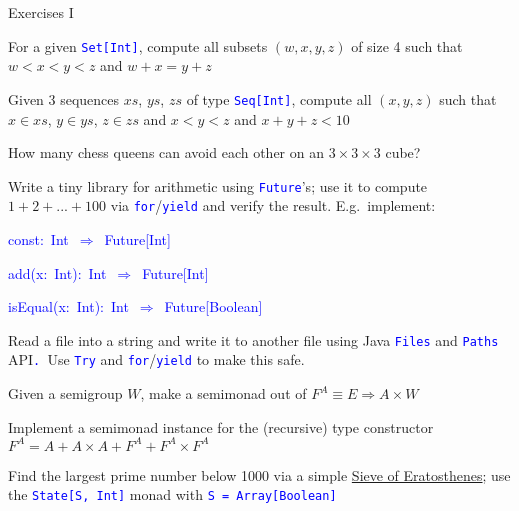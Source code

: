 \documentclass[english]{beamer}
\newenvironment{lyxcode}
   {\par\begin{list}{}{
     \setlength{\rightmargin}{\leftmargin}
     \setlength{\listparindent}{0pt}%
     \raggedright
     \setlength{\itemsep}{0pt}
     \setlength{\parsep}{0pt}
     \normalfont\ttfamily}%
    \def\{{\char`\{}
    \def\}{\char`\}}
    \def\textasciitilde{\char`\~}
    \item[]}
   {\end{list}}
\begin{document}
\begin{frame}{Exercises I}
\begin{enumerate}
\item For a given \texttt{\textcolor{blue}{\footnotesize{}Set{[}Int{]}}},
compute all subsets $\left(w,x,y,z\right)$ of size 4 such that $w<x<y<z$
and $w+x=y+z$
\item Given 3 sequences $xs$, $ys$, $zs$ of type \texttt{\textcolor{blue}{\footnotesize{}Seq{[}Int{]}}},
compute all $\left(x,y,z\right)$ such that $x\in xs$, $y\in ys$,
$z\in zs$ and $x<y<z$ and $x+y+z<10$
\item How many chess queens can avoid each other on an $3\times3\times3$
cube?
\item Write a tiny library for arithmetic using \texttt{\textcolor{blue}{\footnotesize{}Future}}'s;
use it to compute $1+2+...+100$ via \texttt{\textcolor{blue}{\footnotesize{}for}}/\texttt{\textcolor{blue}{\footnotesize{}yield}}
and verify the result. E.g.\ implement: 
\begin{lyxcode}
\textcolor{blue}{\footnotesize{}const:~Int~$\Rightarrow$~Future{[}Int{]}}{\footnotesize \par}

\textcolor{blue}{\footnotesize{}add(x:~Int):~Int~$\Rightarrow$~Future{[}Int{]}}{\footnotesize \par}

\textcolor{blue}{\footnotesize{}isEqual(x:~Int):~Int~$\Rightarrow$~Future{[}Boolean{]}~}{\footnotesize \par}
\end{lyxcode}
\item Read a file into a string and write it to another file using Java
\texttt{\textcolor{blue}{\footnotesize{}Files}} and \texttt{\textcolor{blue}{\footnotesize{}Paths}}
API\texttt{\textcolor{blue}{\footnotesize{}. }}Use \texttt{\textcolor{blue}{\footnotesize{}Try}}
and \texttt{\textcolor{blue}{\footnotesize{}for}}/\texttt{\textcolor{blue}{\footnotesize{}yield}}
to make this safe.
\item Given a semigroup $W$, make a semimonad out of $F^{A}\equiv E\Rightarrow A\times W$ 
\item Implement a semimonad instance for the (recursive) type constructor
$F^{A}=A+A\times A+F^{A}+F^{A}\times F^{A}$
\item Find the largest prime number below 1000 via a simple \href{https://en.wikipedia.org/wiki/Sieve_of_Eratosthenes}{Sieve of Eratosthenes};
use the \texttt{\textcolor{blue}{\footnotesize{}State{[}S, Int{]}}}
monad with \texttt{\textcolor{blue}{\footnotesize{}S = Array{[}Boolean{]}}} 
\end{enumerate}
\end{frame}
\end{document}

